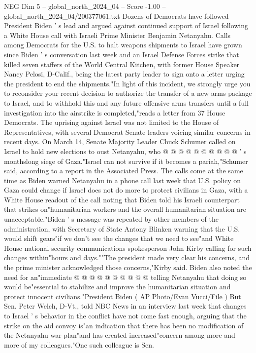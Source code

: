 \begin{textsample}{NEG Dim 5 – global\_north\_2024\_04 – Score -1.00 – global\_north\_2024\_04/200377061.txt}  \label{ex:f5_neg_193}
Dozens of Democrats have followed President Biden ' s lead and argued against continued support of Israel following a White House call with Israeli Prime Minister Benjamin Netanyahu.
Calls among Democrats for the U.S. to halt weapons shipments to Israel have grown since Biden ' s conversation last week and an Israel Defense Forces strike that killed seven staffers of the World Central Kitchen, with former House Speaker Nancy Pelosi, D-Calif., being the latest party leader to sign onto a letter urging the president to end the shipments."In light of this incident, we strongly urge you to reconsider your recent decision to authorize the transfer of a new arms package to Israel, and to withhold this and any future offensive arms transfers until a full investigation into the airstrike is completed,"reads a letter from 37 House Democrats.
The uprising against Israel was not limited to the House of Representatives, with several Democrat Senate leaders voicing similar concerns in recent days.
On March 14, Senate Majority Leader Chuck Schumer called on Israel to hold new elections to oust Netanyahu, who @ @ @ @ @ @ @ @ @ @ ' s monthslong siege of Gaza."Israel can not survive if it becomes a pariah,"Schumer said, according to a report in the Associated Press.
The calls come at the same time as Biden warned Netanyahu in a phone call last week that U.S. policy on Gaza could change if Israel does not do more to protect civilians in Gaza, with a White House readout of the call noting that Biden told his Israeli counterpart that strikes on"humanitarian workers and the overall humanitarian situation are unacceptable."Biden ' s message was repeated by other members of the administration, with Secretary of State Antony Blinken warning that the U.S. would shift gears"if we don't see the changes that we need to see"and White House national security communications spokesperson John Kirby calling for such changes within"hours and days.""The president made very clear his concerns, and the prime minister acknowledged those concerns,"Kirby said.
Biden also noted the need for an"immediate @ @ @ @ @ @ @ @ @ @ telling Netanyahu that doing so would be"essential to stabilize and improve the humanitarian situation and protect innocent civilians."President Biden ( AP Photo/Evan Vucci/File ) But Sen.
Peter Welch, D-Vt., told NBC News in an interview last week that changes to Israel ' s behavior in the conflict have not come fast enough, arguing that the strike on the aid convoy is"an indication that there has been no modification of the Netanyahu war plan"and has created increased"concern among more and more of my colleagues."One such colleague is Sen.

\end{textsample}
